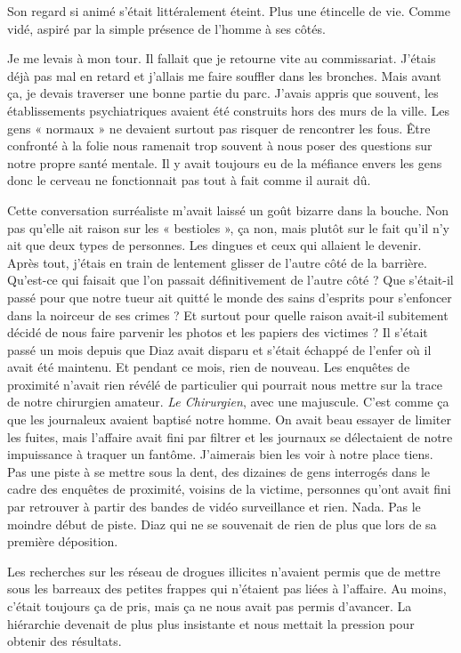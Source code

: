 Son regard si animé s'était littéralement éteint. Plus une étincelle de vie. Comme vidé, aspiré par la simple présence 
de l'homme à ses côtés.

Je me levais à mon tour. Il fallait que je retourne vite au commissariat. J'étais déjà pas mal en retard et 
j'allais me faire souffler dans les bronches. Mais avant ça, je devais traverser une bonne partie du parc.  J'avais 
appris que souvent, les établissements psychiatriques avaient été construits hors des murs de la ville. Les gens 
« normaux » ne devaient surtout pas risquer de rencontrer les fous. Être confronté à la folie nous ramenait trop 
souvent à nous poser des questions sur notre propre santé mentale. Il y avait toujours eu de la méfiance envers les gens 
donc le cerveau ne fonctionnait pas tout à fait comme il aurait dû.

Cette conversation surréaliste m'avait laissé un goût bizarre dans la bouche. Non pas qu'elle ait raison sur les 
« bestioles », ça non, mais plutôt sur le fait qu'il n'y ait que deux types de personnes. Les dingues et ceux qui 
allaient le devenir. Après tout, j'étais en train de lentement glisser de l'autre côté de la barrière. Qu'est-ce qui 
faisait que l'on passait définitivement de l'autre côté ? Que s'était-il passé pour que notre tueur ait quitté le monde 
des sains d'esprits pour s'enfoncer dans la noirceur de ses crimes ? Et surtout pour quelle raison avait-il subitement 
décidé de nous faire parvenir les photos et les papiers des victimes ? Il s'était passé un mois depuis que Diaz avait 
disparu et s'était échappé de l'enfer où il avait été maintenu. Et pendant ce mois, rien de nouveau. Les enquêtes de 
proximité n'avait rien révélé de particulier qui pourrait nous mettre sur la trace de notre chirurgien amateur. \emph{Le 
Chirurgien}, avec une majuscule. C'est comme ça que les journaleux avaient baptisé notre homme. On avait beau essayer de 
limiter les fuites, mais l'affaire avait fini par filtrer et les journaux se délectaient de notre impuissance à traquer 
un fantôme. J'aimerais bien les voir à notre place tiens. Pas une piste à se mettre sous la dent, des dizaines de gens 
interrogés dans le cadre des enquêtes de proximité, voisins de la victime, personnes qu'ont avait fini par retrouver à 
partir des bandes de vidéo surveillance et rien. Nada. Pas le moindre début de piste. Diaz qui ne se souvenait de rien 
de plus que lors de sa première déposition.

Les recherches sur les réseau de drogues illicites n'avaient permis que de mettre sous les barreaux des petites frappes 
qui n'étaient pas liées à l'affaire. Au moins, c'était toujours ça de pris, mais ça ne nous avait pas permis d'avancer. 
La hiérarchie devenait de plus plus insistante et nous mettait la pression pour obtenir des résultats.

